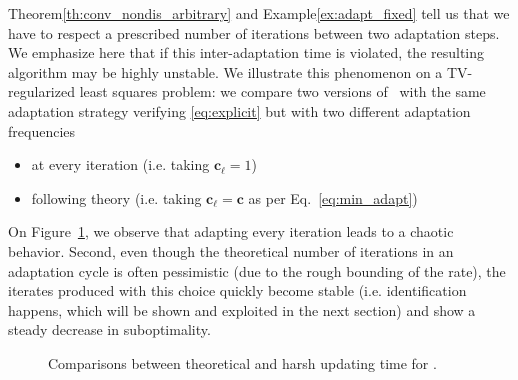 {
\begin{remark}
Theorem\;\ref{th:conv_nondis_arbitrary} and Example\;\ref{ex:adapt_fixed} tell us that we have to respect a prescribed number of iterations between two adaptation steps. We emphasize here that if this inter-adaptation time is violated, the resulting algorithm may be highly unstable. We illustrate this phenomenon on a TV-regularized least squares problem: we compare two versions of \adaalgo~with the same adaptation strategy verifying 
\eqref{eq:explicit} but with two different adaptation frequencies
\begin{itemize}
    \item at every iteration (i.e. taking $\mathbf{c}_\ell = 1$)
    \item following theory (i.e. taking $\mathbf{c}_\ell = \mathbf{c}$ as per Eq.~\eqref{eq:min_adapt})
\end{itemize}
On Figure~\ref{fig:stab}, we observe that adapting every iteration leads to a chaotic behavior. Second, even though the theoretical number of iterations in an adaptation cycle is often pessimistic (due to the rough bounding of the rate), the iterates produced with this choice quickly become stable (i.e. identification happens, which will be shown and exploited in the next section) and show a steady decrease in suboptimality.

\begin{figure}[H]
\begin{center}
 \scalebox{0.9}{}
 \scalebox{0.9}{}
\end{center}
\caption{Comparisons between theoretical and harsh updating time for \adaalgo.}
\label{fig:stab}
\end{figure}

\end{remark}}



